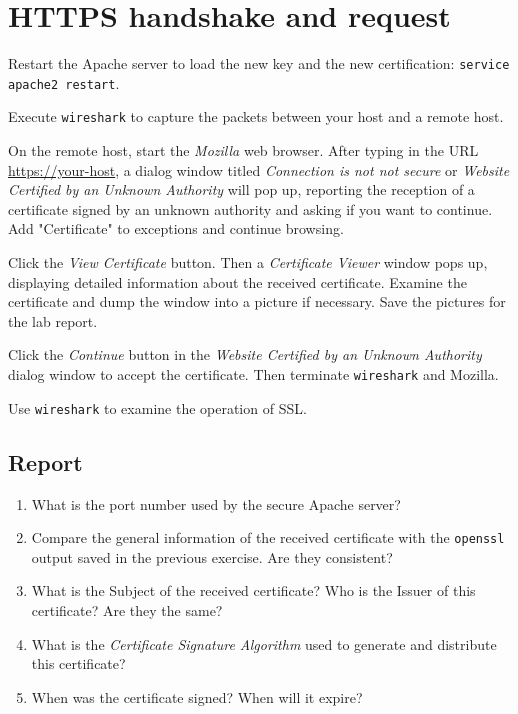 \documentclass{../UTNetLab}
\begin{document}
\section{HTTPS handshake and request}
	Restart the Apache server to load the new key and the new certification: \lstinline{service apache2 restart}.

	Execute \lstinline{wireshark} to capture the packets between your host and a remote host.

	On the remote host, start the \textit{Mozilla} web browser. After typing in the URL \url{https://your-host}, a dialog window titled \textit{Connection is not not secure} or \textit{Website Certified by an Unknown Authority} will pop up, reporting the reception of a certificate signed by an unknown authority and asking if you want to continue. Add "Certificate" to exceptions and continue browsing.

	Click the \textit{View Certificate} button. Then a \textit{Certificate Viewer} window pops up, displaying detailed information about the received certificate. Examine the certificate and dump the window into a picture if necessary. Save the pictures for the lab report.

	Click the \textit{Continue} button in the \textit{Website Certified by an Unknown Authority} dialog window to accept the certificate. Then terminate \lstinline{wireshark} and Mozilla.

	Use \lstinline{wireshark} to examine the operation of SSL.
	
	
	\subsection*{Report}
	\begin{enumerate}
		\item What is the port number used by the secure Apache server?
		\item Compare the general information of the received certificate with the \lstinline{openssl} output saved in the previous exercise. Are they consistent?
		\item What is the Subject of the received certificate? Who is the Issuer of this certificate? Are they the same?
		\item What is the \textit{Certificate Signature Algorithm} used to generate and distribute this certificate?
		\item When was the certificate signed? When will it expire?
	\end{enumerate}
\end{document}
